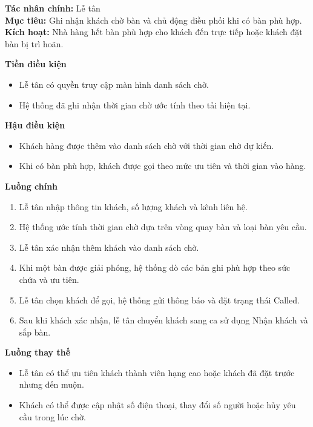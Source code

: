 \documentclass[11pt,a4paper]{article}
\begin{document}
    \begin{usecasebox}[title={UC-RES-03 --- Quản lý danh sách chờ}]
    \textbf{Tác nhân chính:} Lễ tân\\
    \textbf{Mục tiêu:} Ghi nhận khách chờ bàn và chủ động điều phối khi có bàn phù hợp.\\
    \textbf{Kích hoạt:} Nhà hàng hết bàn phù hợp cho khách đến trực tiếp hoặc khách đặt bàn bị trì hoãn.

    \medskip
    \textbf{Tiền điều kiện}
    \begin{itemize}[leftmargin=1.8em]
  \item Lễ tân có quyền truy cập màn hình danh sách chờ.
  \item Hệ thống đã ghi nhận thời gian chờ ước tính theo tải hiện tại.
\end{itemize}

    \textbf{Hậu điều kiện}
    \begin{itemize}[leftmargin=1.8em]
  \item Khách hàng được thêm vào danh sách chờ với thời gian chờ dự kiến.
  \item Khi có bàn phù hợp, khách được gọi theo mức ưu tiên và thời gian vào hàng.
\end{itemize}

    \textbf{Luồng chính}
    \begin{enumerate}[leftmargin=1.8em]
  \item Lễ tân nhập thông tin khách, số lượng khách và kênh liên hệ.
  \item Hệ thống ước tính thời gian chờ dựa trên vòng quay bàn và loại bàn yêu cầu.
  \item Lễ tân xác nhận thêm khách vào danh sách chờ.
  \item Khi một bàn được giải phóng, hệ thống dò các bản ghi phù hợp theo sức chứa và ưu tiên.
  \item Lễ tân chọn khách để gọi, hệ thống gửi thông báo và đặt trạng thái \textsf{Called}.
  \item Sau khi khách xác nhận, lễ tân chuyển khách sang ca sử dụng Nhận khách và sắp bàn.
\end{enumerate}

    \textbf{Luồng thay thế}
    \begin{itemize}[leftmargin=1.8em]
  \item Lễ tân có thể ưu tiên khách thành viên hạng cao hoặc khách đã đặt trước nhưng đến muộn.
  \item Khách có thể được cập nhật số điện thoại, thay đổi số người hoặc hủy yêu cầu trong lúc chờ.
\end{itemize}


\end{usecasebox}
\end{document}
